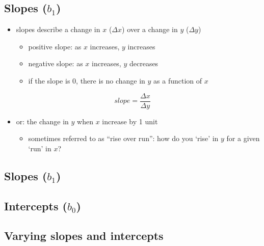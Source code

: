 \documentclass[
  letterpaper,
  DIV=11,
  numbers=noendperiod]{scrartcl}
\providecommand{\tightlist}{%
  \setlength{\itemsep}{0pt}\setlength{\parskip}{0pt}}\usepackage{longtable,booktabs,array}
\begin{document}
\hypertarget{slopes-b_1}{%
\subsection{\texorpdfstring{Slopes
(\(b_1\))}{Slopes (b\_1)}}\label{slopes-b_1}}

\begin{itemize}
\tightlist
\item
  slopes describe a change in \(x\) (\(\Delta x\)) over a change in
  \(y\) (\(\Delta y\))

  \begin{itemize}
  \tightlist
  \item
    positive slope: as \(x\) increases, \(y\) increases
  \item
    negative slope: as \(x\) increases, \(y\) decreases
  \item
    if the slope is 0, there is no change in \(y\) as a function of
    \(x\)
  \end{itemize}
\end{itemize}

\[
slope = \frac{\Delta x}{\Delta y}
\]

\begin{itemize}
\tightlist
\item
  or: the change in \(y\) when \(x\) increase by 1 unit

  \begin{itemize}
  \tightlist
  \item
    sometimes referred to as ``rise over run'': how do you `rise' in
    \(y\) for a given `run' in \(x\)?
  \end{itemize}
\end{itemize}

\hypertarget{slopes-b_1-1}{%
\subsection*{\texorpdfstring{Slopes
(\(b_1\))}{Slopes (b\_1)}}\label{slopes-b_1-1}}

\hypertarget{intercepts-b_0}{%
\subsection{\texorpdfstring{Intercepts
(\(b_0\))}{Intercepts (b\_0)}}\label{intercepts-b_0}}

\hypertarget{varying-slopes-and-intercepts}{%
\subsection{Varying slopes and
intercepts}\label{varying-slopes-and-intercepts}}
\end{document}
